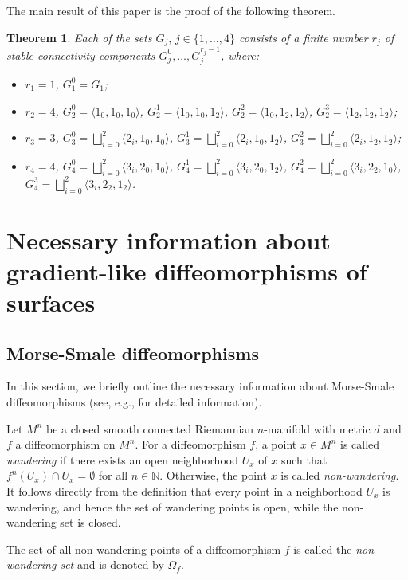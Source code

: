 \documentclass{amsart}
\newtheorem{theorem}{Theorem}
\numberwithin{equation}{section}
\begin{document}
	The main result of this paper is the proof of the following theorem.
	
	\begin{theorem}\label{C_i} Each of the sets $G_j,\,j\in\{1,\dots,4\}$ consists of a finite number $r_j$ of stable connectivity components $G_j^0,\dots,G_j^{r_j-1}$, where:
		\begin{itemize}
			\item[1)] $r_1=1$, $G_1^0=G_1$;
			\item[2)] $r_2=4$, $G_2^0=\langle 1_0,1_0,1_0\rangle$, $G_2^1=\langle 1_0,1_0,1_2\rangle$,
			$G_2^2=\langle 1_0,1_2,1_2\rangle$,
			$G_2^3=\langle 1_2,1_2,1_2\rangle$;
			\item[3)] $r_3=3$, $G_3^0=\bigsqcup\limits_{i=0}^2\langle 2_i,1_0,1_0\rangle$, $G_3^1=\bigsqcup\limits_{i=0}^2\langle 2_i,1_0,1_2\rangle$,
			$G_3^2=\bigsqcup\limits_{i=0}^2\langle 2_i,1_2,1_2\rangle$;
			\item[4)] $r_4=4$, $G_4^0=\bigsqcup\limits_{i=0}^2\langle 3_i,2_0,1_0\rangle$, $G_4^1=\bigsqcup\limits_{i=0}^2\langle 3_i,2_0,1_2\rangle$,
			$G_4^2=\bigsqcup\limits_{i=0}^2\langle 3_i,2_2,1_0\rangle$,
			$G_4^3=\bigsqcup\limits_{i=0}^2\langle 3_i,2_2,1_2\rangle$.
		\end{itemize}
	\end{theorem}	
	
	\section{Necessary information about gradient-like diffeomorphisms of surfaces}
	\subsection{Morse-Smale diffeomorphisms} In this section, we briefly outline the necessary information about Morse-Smale diffeomorphisms (see, e.g., \cite{grin} for detailed information).
	
	Let $M^n$ be a closed smooth connected Riemannian $n$-manifold with metric $d$ and $f$ a diffeomorphism on $M^n$. For a diffeomorphism $f$, a point $x\in M^n$ is called {\it wandering} if there exists an open neighborhood $U_x$ of $x$ such that $f^{n}(U_x)\cap U_x=\emptyset$ for all $n\in \mathbb{N}$. Otherwise, the point $x$ is called {\it non-wandering}. 
	It follows directly from the definition that every point in a neighborhood $U_x$ is wandering, and hence the set of wandering points is open, while the non-wandering set is closed. 
	
	The set of all non-wandering points of a diffeomorphism $f$ is called the {\it non-wandering set} and is denoted by $\Omega_f$.
	
\end{document}
